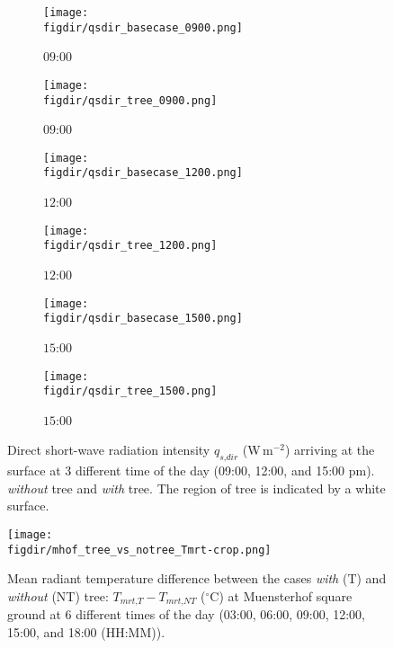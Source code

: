 \begin{figure}[p]
	\centering
	\begin{subfigure}[b]{.45\linewidth}
		\texttt{[image: \\figdir/qsdir\_basecase\_0900.png]}
		\caption{$09$:$00$}\label{fig:qrdir_basecase_0900}
	\end{subfigure}\hspace*{\fill}
	\begin{subfigure}[b]{.45\linewidth}
		\texttt{[image: \\figdir/qsdir\_tree\_0900.png]}
		\caption{$09$:$00$}\label{fig:qrdir_tree_0900}
	\end{subfigure}
	
	\medskip
	\begin{subfigure}[b]{.45\linewidth}
		\texttt{[image: \\figdir/qsdir\_basecase\_1200.png]}
		\caption{$12$:$00$}\label{fig:qsdir_basecase_1200}
	\end{subfigure}\hspace*{\fill}
	\begin{subfigure}[b]{.45\linewidth}
		\texttt{[image: \\figdir/qsdir\_tree\_1200.png]}
		\caption{$12$:$00$}\label{fig:qsdir_tree_1200}
	\end{subfigure}
	
	\medskip
	\begin{subfigure}[b]{.45\linewidth}
		\texttt{[image: \\figdir/qsdir\_basecase\_1500.png]}
		\caption{$15$:$00$}\label{fig:qsdir_basecase_1500}
	\end{subfigure}\hspace*{\fill}
	\begin{subfigure}[b]{.45\linewidth}
		\texttt{[image: \\figdir/qsdir\_tree\_1500.png]}
		\caption{$15$:$00$}\label{fig:qsdir_tree_1500}
	\end{subfigure}
	
	\caption{Direct short-wave radiation intensity $q_{\textit{s,dir}}$ (W\,m$^{-2}$) arriving at the surface at 3 different time of the day (09:00, 12:00, and 15:00 pm).  \textit{without} tree and  \textit{with} tree. The region of tree is indicated by a white surface. }
	\label{fig:qsdir_muensterhof}	
\end{figure}


\begin{figure}[p]
	\centering
	\texttt{[image: \\figdir/mhof\_tree\_vs\_notree\_Tmrt-crop.png]}
	\caption{Mean radiant temperature difference between the cases \textit{with} (T) and \textit{without} (NT) tree: $T_{\textit{mrt,T}}-T_{\textit{mrt,NT}}$ ($^{\circ}$C) at Muensterhof square ground at 6 different times of the day (03:00, 06:00, 09:00, 12:00, 15:00, and 18:00 (HH:MM)).}
	\label{fig:Tmrtdiff_muensterhof}
\end{figure}

